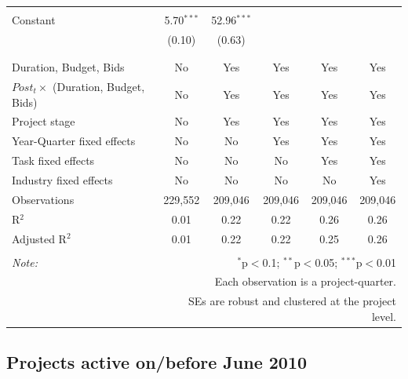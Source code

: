 \documentclass[
]{article}
\begin{document}
\begin{table}[H]
\begin{tabular}{@{\extracolsep{-2pt}}lccccc}
  & & & & & \\ 
 Constant & 5.70$^{***}$ & 52.96$^{***}$ &  &  &  \\ 
  & (0.10) & (0.63) &  &  &  \\ 
  & & & & & \\ 
\hline \\[-1.8ex] 
Duration, Budget, Bids & No & Yes & Yes & Yes & Yes \\ 
$Post_t \times $  (Duration, Budget, Bids) & No & Yes & Yes & Yes & Yes \\ 
Project stage & No & Yes & Yes & Yes & Yes \\ 
Year-Quarter fixed effects & No & No & Yes & Yes & Yes \\ 
Task fixed effects & No & No & No & Yes & Yes \\ 
Industry fixed effects & No & No & No & No & Yes \\ 
Observations & 229,552 & 209,046 & 209,046 & 209,046 & 209,046 \\ 
R$^{2}$ & 0.01 & 0.22 & 0.22 & 0.26 & 0.26 \\ 
Adjusted R$^{2}$ & 0.01 & 0.22 & 0.22 & 0.25 & 0.26 \\ 
\hline 
\hline \\[-1.8ex] 
\textit{Note:}  & \multicolumn{5}{r}{$^{*}$p$<$0.1; $^{**}$p$<$0.05; $^{***}$p$<$0.01} \\ 
 & \multicolumn{5}{r}{Each observation is a project-quarter.} \\ 
 & \multicolumn{5}{r}{SEs are robust and clustered at the project level.} \\ 
\end{tabular} 
\end{table}

\hypertarget{projects-active-onbefore-june-2010-1}{%
\subsection{Projects active on/before June
2010}\label{projects-active-onbefore-june-2010-1}}
\end{document}
